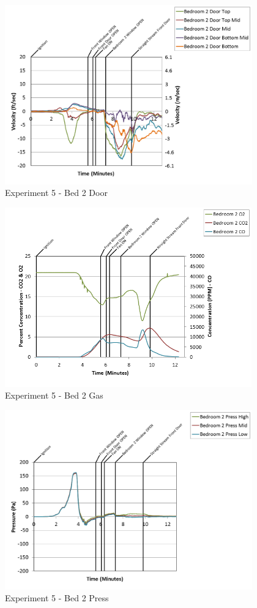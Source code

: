 \documentclass{article}
\begin{document}
\begin{appendices}
\begin{figure}[h!]
	\centering
	\includegraphics[height=3.05in]{0_Images/Results_Charts/Exp_5_Charts/Bed2Door.png}
	\caption{Experiment 5 - Bed 2 Door}
\end{figure}

\clearpage

\begin{figure}[h!]
	\centering
	\includegraphics[height=3.05in]{0_Images/Results_Charts/Exp_5_Charts/Bed2Gas.png}
	\caption{Experiment 5 - Bed 2 Gas}
\end{figure}


\begin{figure}[h!]
	\centering
	\includegraphics[height=3.05in]{0_Images/Results_Charts/Exp_5_Charts/Bed2Press.png}
	\caption{Experiment 5 - Bed 2 Press}
\end{figure}


\end{appendices}
\end{document}
